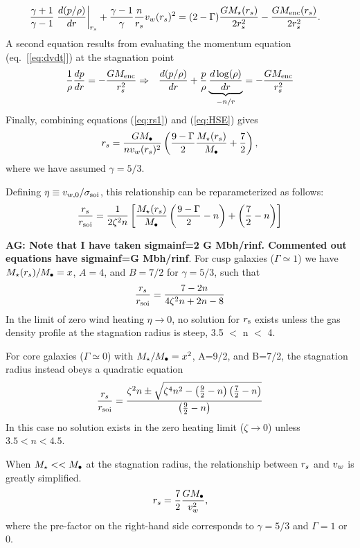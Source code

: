 \begin{align}
&\frac{\gamma+1}{\gamma-1}
\left.\frac{d (p/\rho)}{d r}\right|_{r_s}+ \frac{\gamma-1}{\gamma} \frac{n}{r_s} v_w(r_s)^{2} = (2-\Gamma) \frac{G
  M_{\star}(r_s)}{2 r_s^2} -\frac{G M_{\rm enc}(r_s)}{2 r_s^2}.  \label{eq:rs1}
\end{align}
A second equation results from evaluating the momentum equation (eq.~[\ref{eq:dvdt}]) at the stagnation point
\begin{align}
&\frac{1}{\rho}\frac{d p}{d r}=- \frac{GM_{\rm enc}}{r_s^2} \Rightarrow
&\frac{d (p/\rho)}{d r}+\frac{p}{\rho}
\underbrace{\frac{d\log(\rho)}{dr}}_{-n/r} = -\frac{G M_{\rm enc}}{r_s^2} \label{eq:HSE}
\end{align}
Finally, combining equations (\ref{eq:rs1}) and (\ref{eq:HSE}) gives 
\begin{align}
r_s=\frac{G M_{\bullet}}{n v_w(r_s)^2}\left(\frac{9-\Gamma}{2} \frac{M_{\star}(r_s)}{M_{\bullet}} +\frac{7}{2}\right),
\label{eq:rs2main}
\end{align}
where we have assumed $\gamma=5/3$.

Defining $\eta \equiv v_{w,0}/\sigma_{\rm soi}$, this relationship can be reparameterized as follows:
\begin{align}
  \frac{r_s}{r_{\rm soi}}=\frac{1}{2 \zeta^2 n}\left[
   \frac{M_{\star}(r_s)}{M_{\bullet}}\left(\frac{9-\Gamma}{2}-n\right)+\left(\frac{7}{2}-n\right)\right]
\end{align}

{\bf AG: Note that I have taken sigmainf=2 G Mbh/rinf. Commented out
  equations have sigmainf=G Mbh/rinf}. For cusp galaxies ($\Gamma\simeq1$) we have $M_{\star}(r_s)/M_{\bullet}=x$, $A=4$, and $B=7/2$ for $\gamma = 5/3$, such that 
\begin{align}
\frac{r_s}{r_{\rm soi}}=\frac{7-2n}{4\zeta^2 n+2n-8}
\end{align}
In the limit of zero wind heating $\eta \rightarrow 0$, no solution for $r_{\rm s}$ exists unless the gas density profile at the stagnation radius is steep, 3.5 $<$ n $<$ 4.  

For core galaxies ($\Gamma \simeq 0$) with $M_{\star}/M_{\bullet}=x^2$, A=9/2,
and B=7/2, the stagnation radius instead obeys a quadratic equation
\begin{align}
\frac{r_s}{r_{\rm soi}}=\frac{\zeta^2 n \pm \sqrt{\zeta^4 n^2 - \left(\frac{9}{2}-n\right)
    \left(\frac{7}{2}-n\right)}}{\left(\frac{9}{2}-n\right)}
\label{eq:rstag}
\end{align}
In this case no solution exists in the zero heating limit ($\zeta \rightarrow 0$) unless $3.5<n<4.5$.

When $M_{\star} << M_{\bullet}$ at the stagnation radius, the relationship between $r_s$ and $v_w$ is greatly simplified. 
\begin{align}
r_s=\frac{7}{2}\frac{G M_{\bullet}}{v_w^2},
\end{align}
where the pre-factor on the right-hand side corresponds to
$\gamma=5/3$ and $\Gamma=1$ or 0.  



